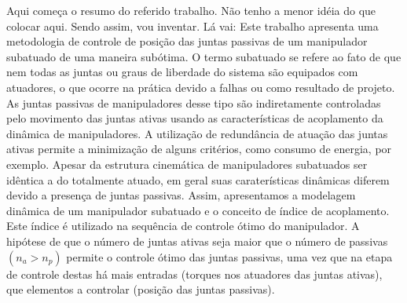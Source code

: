 Aqui começa o resumo do referido trabalho. Não tenho a menor idéia do que colocar aqui. Sendo assim, vou inventar. Lá vai: Este trabalho apresenta uma metodologia de controle de posição das juntas passivas de um manipulador subatuado de uma maneira subótima. O termo subatuado se refere ao fato de que nem todas as juntas ou graus de liberdade do sistema são equipados com atuadores, o que ocorre na prática devido a falhas ou como resultado de projeto. As juntas passivas de manipuladores desse tipo são indiretamente controladas pelo movimento das juntas ativas usando as características de acoplamento da dinâmica de manipuladores. A utilização de redundância de atuação das juntas ativas permite a minimização de alguns critérios, como consumo de energia, por exemplo.
Apesar da estrutura cinemática de manipuladores subatuados ser idêntica a do totalmente atuado, em geral suas caraterísticas dinâmicas diferem devido a presença de juntas passivas. Assim, apresentamos a modelagem dinâmica de um manipulador subatuado e o conceito de índice de acoplamento. Este índice é utilizado na sequência de controle ótimo do \mbox{manipulador}.
A hipótese de que o número de juntas ativas seja maior que o número de
passivas  $(n_{a} > n_{p})$  permite o controle ótimo das juntas passivas, uma vez que na etapa
de controle destas há mais entradas (torques nos atuadores das juntas ativas), que
elementos a controlar (posição das juntas passivas). 